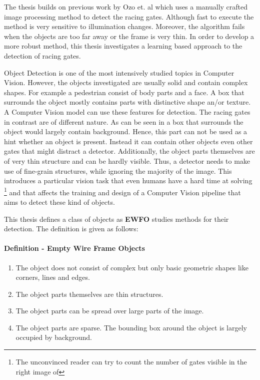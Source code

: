 The thesis builds on previous work by Ozo et. al  which uses a manually crafted image processing method to detect the racing gates. Although fast to execute the method is very sensitive to illumination changes. Moreover, the algorithm fails when the objects are too far away or the frame is very thin. In order to develop a more robust method, this thesis investigates a learning based approach to the detection of racing gates.

Object Detection is one of the most intensively studied topics in Computer Vision. However, the objects investigated are usually solid and contain complex shapes. For example a pedestrian consist of body parts and a face. A box that surrounds the object mostly contains parts with distinctive shape an/or texture. A Computer Vision model can use these features for detection. The racing gates in contrast are of different nature. As can be seen in  a box that surrounds the object would largely contain background. Hence, this part can not be used as a hint whether an object is present. Instead it can contain other objects even other gates that might distract a detector. Additionally, the object parts themselves are of very thin structure and can be hardly visible. Thus, a detector needs to make use of fine-grain structures, while ignoring the majority of the image. This introduces a particular vision task that even humans have a hard time at solving \footnote{The unconvinced reader can try to count the number of gates visible in the right image of } and that affects the training and design of a Computer Vision pipeline that aims to detect these kind of objects.

This thesis defines a class of objects as \textbf{\ac{EWFO}} studies methods for their detection. The definition is given as follows:

\paragraph{Definition - Empty Wire Frame Objects}	
\begin{enumerate}
	\item The object does not consist of complex but only basic geometric shapes like corners, lines and edges.
	\item The object parts themselves are thin structures.
	\item The object parts can be spread over large parts of the image.
	\item The object parts are sparse. The bounding box around the object is largely occupied by background.
\end{enumerate}

